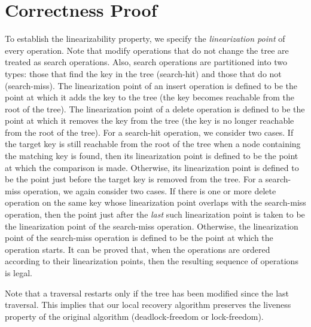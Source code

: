 \section{Correctness Proof}
\label{sec:proof}
To establish the linearizability property, we specify the \emph{linearization point} of every operation.
Note that modify operations that do not change the tree are treated as search operations.
Also, search operations are partitioned into two types: those that find the key in the tree (search-hit) and those that do not (search-miss).
The linearization point of an insert operation is defined to be the point at which it adds the key to the tree (the key becomes reachable from the root of the tree).
The linearization point of a delete operation is defined to be the point at which it removes the key from the tree (the key is no longer reachable from the root of the tree).
For a search-hit operation, we consider two cases.
If the target key is still reachable from the root of the tree when a node containing the matching key is found, then its linearization point is defined to be the point at which the comparison is made.
Otherwise, its linearization point is defined to be the point just before the target key is removed from the tree.
For a search-miss operation, we again consider two cases.
If there is one or more delete operation on the same key whose linearization point overlaps with the search-miss operation, then the point just after the \emph{last} such linearization point is taken to be the linearization point of the search-miss operation.
Otherwise, the linearization point of the search-miss operation is defined to be the point at which the operation starts.
It can be proved that, when the operations are ordered according to their linearization points, then the resulting sequence of operations is legal.

Note that a traversal restarts only if the tree has been modified since the last traversal.
This implies that our local recovery algorithm preserves the liveness property of the original algorithm (deadlock-freedom or lock-freedom).